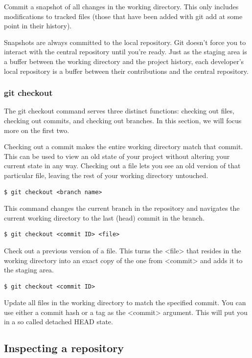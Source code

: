 \documentclass{article}
\begin{document}
Commit a snapshot of all changes in the working directory. This only
includes modifications to tracked files (those that have been added
with git add at some point in their history).

Snapshots are always committed to the local repository. Git doesn't
force you to interact with the central repository until you're
ready. Just as the staging area is a buffer between the working
directory and the project history, each developer's local repository
is a buffer between their contributions and the central repository.

\subsubsection*{git checkout}

The git checkout command serves three distinct functions: checking out
files, checking out commits, and checking out branches. In this
section, we will focus more on the first two.

Checking out a commit makes the entire working directory match that
commit. This can be used to view an old state of your project without
altering your current state in any way. Checking out a file lets you
see an old version of that particular file, leaving the rest of your
working directory untouched.

\begin{lstlisting}
$ git checkout <branch name>
\end{lstlisting}

This command changes the current branch in the repository and navigates
the current working directory to the last (head) commit in the branch.

\begin{lstlisting}
$ git checkout <commit ID> <file>
\end{lstlisting}
Check out a previous version of a file. This turns the <file> that
resides in the working directory into an exact copy of the one from
<commit> and adds it to the staging area.

\begin{lstlisting}
$ git checkout <commit ID>
\end{lstlisting}

Update all files in the working directory to match the specified
commit. You can use either a commit hash or a tag as the <commit>
argument. This will put you in a so called detached HEAD state.

\subsection{Inspecting a repository}
\end{document}
